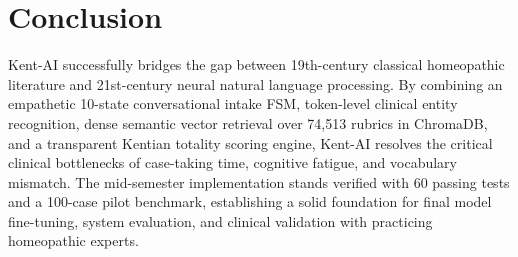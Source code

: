 \begin{sloppypar}
\section{Conclusion}
Kent-AI successfully bridges the gap between 19th-century classical homeopathic literature and 21st-century neural natural language processing. By combining an empathetic 10-state conversational intake FSM, token-level clinical entity recognition, dense semantic vector retrieval over 74,513 rubrics in ChromaDB, and a transparent Kentian totality scoring engine, Kent-AI resolves the critical clinical bottlenecks of case-taking time, cognitive fatigue, and vocabulary mismatch. The mid-semester implementation stands verified with 60 passing tests and a 100-case pilot benchmark, establishing a solid foundation for final model fine-tuning, system evaluation, and clinical validation with practicing homeopathic experts.

\end{sloppypar}
